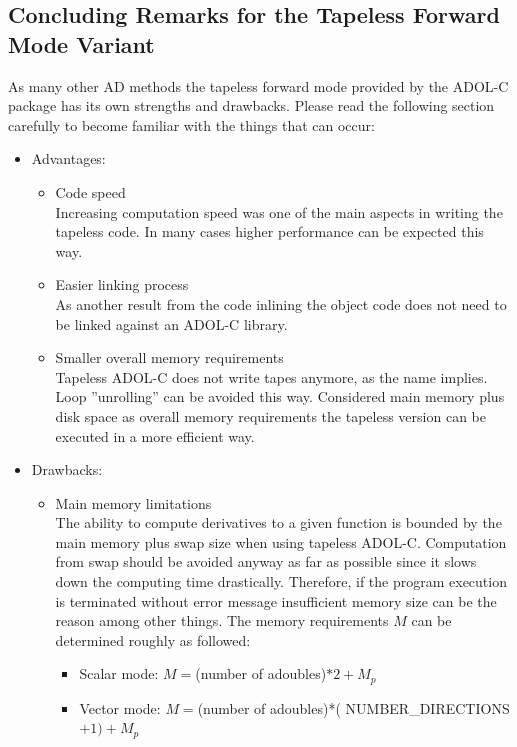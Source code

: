 \documentclass[11pt,twoside]{article}
\begin{document}
\subsection{Concluding Remarks for the Tapeless Forward Mode Variant}
%
As many other AD methods the tapeless forward mode provided by the
ADOL-C package has its own strengths and drawbacks. Please read the
following section carefully to become familiar with the things that
can occur: 
\begin{itemize}
  \item Advantages:
    \begin{itemize}
      \item Code speed\\
	Increasing computation speed was one of the main aspects in writing
	the tapeless code. In many cases higher performance can be
	expected this way. 
      \item Easier linking process\\
	As another result from the code inlining the object code does
	not need to be linked against an ADOL-C library.
      \item Smaller overall memory requirements\\
	Tapeless ADOL-C does not write tapes anymore, as the name
	implies. Loop ''unrolling'' can be avoided this
	way. Considered main memory plus disk space as overall memory
	requirements the tapeless version can be 
	executed in a more efficient way. 
    \end{itemize}
  \item Drawbacks:
    \begin{itemize}
    \item Main memory limitations\\
      The ability to compute derivatives to a given function is
      bounded by the main memory plus swap size  when using
      tapeless ADOL-C. Computation from swap should be avoided anyway
      as far as possible since it slows down the computing time
      drastically. Therefore, if the program execution is  
      terminated without error message insufficient memory size can be
      the reason among other things. The memory requirements $M$ can
      be determined roughly as followed: 
      \begin{itemize}
        \item Scalar mode: $M=$(number of {\sf adouble}s)$*2 + M_p$
	\item Vector mode: $M=$(number of {\sf adouble}s)*({\sf
	  NUMBER\_DIRECTIONS}$+1) + M_p$ 
      \end{itemize}

\end{itemize}
\end{itemize}
\end{document}
